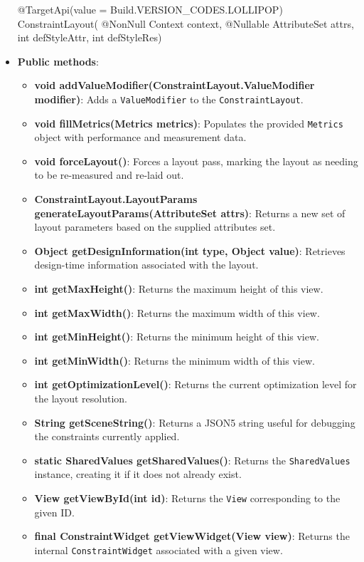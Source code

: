 \documentclass{report}
\begin{document}
\begin{itemize}
\begin{javacode}
                @TargetApi(value = Build.VERSION_CODES.LOLLIPOP)
                ConstraintLayout( @NonNull Context context, @Nullable AttributeSet attrs, int defStyleAttr, int defStyleRes)
            \end{javacode}
        \item \textbf{Public methods}:
            \begin{itemize}
                \item \textbf{void addValueModifier(ConstraintLayout.ValueModifier modifier)}: Adds a \texttt{ValueModifier} to the \texttt{ConstraintLayout}.
                \item \textbf{void fillMetrics(Metrics metrics)}: Populates the provided \texttt{Metrics} object with performance and measurement data.
                \item \textbf{void forceLayout()}: Forces a layout pass, marking the layout as needing to be re-measured and re-laid out.
                \item \textbf{ConstraintLayout.LayoutParams generateLayoutParams(AttributeSet attrs)}: Returns a new set of layout parameters based on the supplied attributes set.
                \item \textbf{Object getDesignInformation(int type, Object value)}: Retrieves design-time information associated with the layout.
                \item \textbf{int getMaxHeight()}: Returns the maximum height of this view.
                \item \textbf{int getMaxWidth()}: Returns the maximum width of this view.
                \item \textbf{int getMinHeight()}: Returns the minimum height of this view.
                \item \textbf{int getMinWidth()}: Returns the minimum width of this view.
                \item \textbf{int getOptimizationLevel()}: Returns the current optimization level for the layout resolution.
                \item \textbf{String getSceneString()}: Returns a JSON5 string useful for debugging the constraints currently applied.
                \item \textbf{static SharedValues getSharedValues()}: Returns the \texttt{SharedValues} instance, creating it if it does not already exist.
                \item \textbf{View getViewById(int id)}: Returns the \texttt{View} corresponding to the given ID.
                \item \textbf{final ConstraintWidget getViewWidget(View view)}: Returns the internal \texttt{ConstraintWidget} associated with a given view.

\end{itemize}
\end{itemize}
\end{document}
